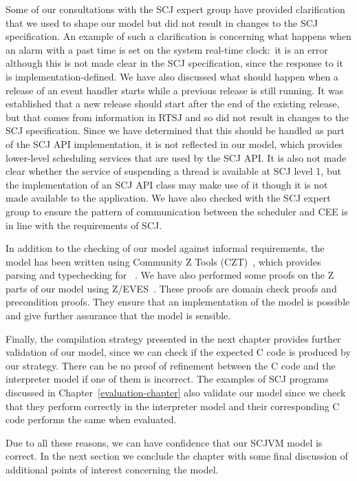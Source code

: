 Some of our consultations with the SCJ expert group have provided
clarification that we used to shape our model but did not result in
changes to the SCJ specification.
An example of such a clarification is concerning what happens when an
alarm with a past time is set on the system real-time clock:~it is an
error although this is not made clear in the SCJ specification, since
the response to it is implementation-defined.
We have also discussed what should happen when a release of an event
handler starts while a previous release is still running.
It was established that a new release should start after the end of
the existing release, but that comes from information in RTSJ and so
did not result in changes to the SCJ specification.
Since we have determined that this should be handled as part of the
SCJ API implementation, it is not reflected in our model, which
provides lower-level scheduling services that are used by the SCJ API.
It is also not made clear whether the service of suspending a thread
is available at SCJ level 1, but the implementation of an SCJ API
class may make use of it though it is not made available to the
application.
We have also checked with the SCJ expert group to ensure the pattern
of communication between the scheduler and CEE is in line with the
requirements of SCJ.

In addition to the checking of our model against informal
requirements, the model has been written using Community Z Tools
(CZT)~\cite{malik2005}, which provides parsing and typechecking for
\Circus{}~\cite{malik2011}.
We have also performed some proofs on the Z parts of our model using
Z/EVES~\cite{saaltink1997}.
These proofs are domain check proofs and precondition proofs.
They ensure that an implementation of the model is possible and give
further assurance that the model is sensible.

Finally, the compilation strategy presented in the next chapter
provides further validation of our model, since we can check if the
expected C code is produced by our strategy.
There can be no proof of refinement between the C code and the
interpreter model if one of them is incorrect.
The examples of SCJ programs discussed in
Chapter~\ref{evaluation-chapter} also validate our model since we
check that they perform correctly in the interpreter model and their
corresponding C code performs the same when evaluated.

Due to all these reasons, we can have confidence that our SCJVM model
is correct.
In the next section we conclude the chapter with some final discussion
of additional points of interest concerning the model.


